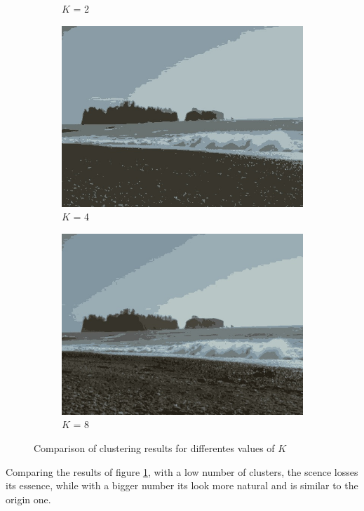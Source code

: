 \begin{figure}[!h]
\begin{subfigure}{0.5\textwidth}
	  \caption{$K$ = 2}
	\end{subfigure}
	\begin{subfigure}{0.5\textwidth}
        \centering
        \includegraphics[width=0.9\linewidth]{figs/beach_1_clustK4.jpg}
        \caption{$K$ = 4}
    \end{subfigure}%
    \begin{subfigure}{0.5\textwidth}
	  \centering
	  \includegraphics[width=0.9\linewidth]{figs/beach_1_clustK8.jpg}
	\caption{$K$ = 8}
	\end{subfigure}
	
    \caption{Comparison of clustering results for differentes values of $K$}
	\label{fig:clusters}
\end{figure}

Comparing the results of figure \ref{fig:clusters}, with a low number of clusters, the scence losses its essence, while with a bigger number its look more natural and is similar to the origin one.

